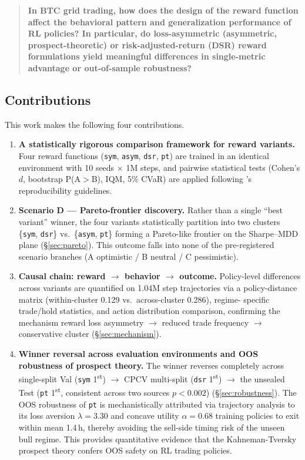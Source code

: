 \documentclass[11pt, a4paper]{article}
\begin{document}
\begin{quote}
\textbf{In BTC grid trading, how does the design of the reward function affect
the behavioral pattern and generalization performance of RL policies? In
particular, do loss-asymmetric (asymmetric, prospect-theoretic) or
risk-adjusted-return (DSR) reward formulations yield meaningful differences in
single-metric advantage or out-of-sample robustness?}
\end{quote}

\subsection{Contributions}
\label{sec:intro_contribution}

This work makes the following four contributions.

\begin{enumerate}[leftmargin=*]
\item \textbf{A statistically rigorous comparison framework for reward variants.}
Four reward functions (\texttt{sym}, \texttt{asym}, \texttt{dsr}, \texttt{pt}) are
trained in an identical environment with 10 seeds $\times$ 1M steps, and pairwise
statistical tests (Cohen's $d$, bootstrap P(A$>$B), IQM, 5\% CVaR) are applied
following \citet{henderson2018rlreproducibility}'s reproducibility guidelines.
\item \textbf{Scenario D --- Pareto-frontier discovery.} Rather than a single
``best variant'' winner, the four variants statistically partition into two
clusters \{\texttt{sym}, \texttt{dsr}\} vs.\ \{\texttt{asym}, \texttt{pt}\}
forming a Pareto-like frontier on the Sharpe--MDD plane
(\S\ref{sec:pareto}). This outcome falls into none of the pre-registered scenario
branches (A optimistic / B neutral / C pessimistic).
\item \textbf{Causal chain: reward $\to$ behavior $\to$ outcome.} Policy-level
differences across variants are quantified on 1.04M step trajectories via a
policy-distance matrix (within-cluster 0.129 vs.\ across-cluster 0.286), regime-
specific trade/hold statistics, and action distribution comparison, confirming
the mechanism reward loss asymmetry $\to$ reduced trade frequency $\to$
conservative cluster (\S\ref{sec:mechanism}).
\item \textbf{Winner reversal across evaluation environments and OOS robustness
of prospect theory.} The winner reverses completely across single-split Val
(\texttt{sym} 1\textsuperscript{st}) $\to$ CPCV multi-split
(\texttt{dsr} 1\textsuperscript{st}) $\to$ the unsealed Test
(\texttt{pt} 1\textsuperscript{st}, consistent across two sources $p<0.002$)
(\S\ref{sec:robustness}). The OOS robustness of \texttt{pt} is mechanistically
attributed via trajectory analysis to its loss aversion $\lambda=3.30$ and
concave utility $\alpha=0.68$ training policies to exit within mean 1.4\,h,
thereby avoiding the sell-side timing risk of the unseen bull regime. This
provides quantitative evidence that the Kahneman-Tversky prospect theory
\citep{kahneman1979prospect} confers OOS safety on RL trading policies.
\end{enumerate}
\end{document}
